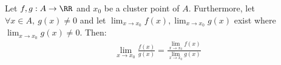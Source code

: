 \documentclass[class=scrartcl, crop=false]{standalone}
\begin{document}
\begin{theorem}
  Let $f, g : A \to \RR$ and $x_0$ be a cluster point of $A$. Furthermore, let $\forall x \in A,\ g(x) \neq 0$ and let $\lim_{x \to x_0}f(x), \lim_{x \to x_0}g(x)$ exist where $\lim_{x \to x_0}g(x) \neq 0$. Then:
  \begin{gather*}
    \lim_{x \to x_0} \frac{f(x)}{g(x)} = \frac{\lim_{x \to x_0}f(x)}{\lim_{x \to x_0}g(x)}
  \end{gather*} 
\end{theorem} 
\end{document}
